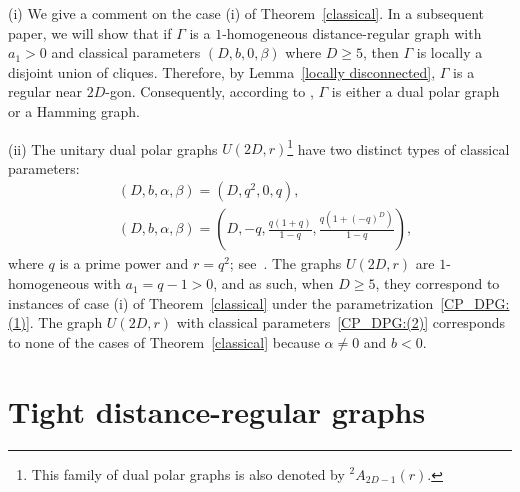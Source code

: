 \begin{rema}
(i) We give a comment on the case (i) of Theorem~\ref{classical}. 
In a subsequent paper, we will show that if $\Gamma$ is a $1$-homogeneous distance-regular graph with $a_1>0$ and classical parameters $(D,b,0,\beta)$ where $D\geqslant 5$, then $\Gamma$ is locally a disjoint union of cliques. 
Therefore, by Lemma~\ref{locally disconnected}, $\Gamma$ is a regular near $2D$-gon. 
Consequently, according to {\cite[Theorem 9.4.4]{BCN}}, $\Gamma$ is either a dual polar graph or a Hamming graph. 

(ii) The unitary dual polar graphs $U(2D,r)$\footnote{This family of dual polar graphs is also denoted by ${}^2A_{2D-1}(r)$.} have two distinct types of classical parameters:
\begin{align}
	& (D, b, \alpha, \beta) = \left( D, q^2, 0, q \right), \label{CP_DPG:(1)}\\
	& (D, b, \alpha, \beta) = \left( D, -q, \frac{q(1+q)}{1-q}, \frac{q\left(1+(-q)^D\right)}{1-q}\right), \label{CP_DPG:(2)}
\end{align}
where $q$ is a prime power and $r = q^2$; see~\cite[Section 6.2]{BCN}.
The graphs $U(2D, r)$ are $1$-homogeneous with $a_1 = q - 1 > 0$, and as such, when $D \geqslant 5$, they correspond to instances of case (i) of Theorem~\ref{classical} under the parametrization~\eqref{CP_DPG:(1)}.
The graph $U(2D, r)$ with classical parameters~\eqref{CP_DPG:(2)} corresponds to none of the cases of Theorem~\ref{classical} because $\alpha \neq 0$ and $b < 0$.
\end{rema}

\section{Tight distance-regular graphs}\label{sec:tightDRGs}


